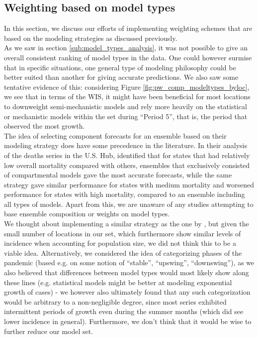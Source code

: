 \subsection{Weighting based on model types} \label{sub:weighting_based_on_model_types}
In this section, we discuss our efforts of implementing weighting schemes that are based on the modeling strategies as discussed previously.\\
As we saw in section \ref{sub:model_types_analysis}, it was not possible to give an overall consistent ranking of model types in the data. One could however surmise that in specific situations, one general type of modeling philosophy could be better suited than another for giving accurate predictions. We also saw some tentative evidence of this: considering Figure \ref{fig:pw_comp_modeltypes_byloc}, we see that in terms of the WIS, it might have been beneficial for most locations to downweight semi-mechanistic models and rely more heavily on the statistical or mechanistic models within the set during ``Period 5'', that is, the period that observed the most growth.\\
The idea of selecting component forecasts for an ensemble based on their modeling strategy does have some precedence in the literature. In their analysis of the deaths series in the U.S. Hub, \cite{taylor_combining_2021} identified that for states that had relatively low overall mortality compared with others, ensembles that exclusively consisted of compartmental models gave the most accurate forecasts, while the same strategy gave similar performance for states with medium mortality and worsened performance for states with high mortality, compared to an ensemble including all types of models. Apart from this, we are unaware of any studies attempting to base ensemble composition or weights on model types.\\
We thought about implementing a similar strategy as the one by \cite{taylor_combining_2021}, but given the small number of locations in our set, which furthermore show similar levels of incidence when accounting for population size, we did not think this to be a viable idea. Alternatively, we considered the idea of categorizing phases of the pandemic (based e.g. on some notion of ``stable'', ``upswing'', ``downswing''), as we also believed that differences between model types would most likely show along these lines (e.g. statistical models might be better at modeling exponential growth of cases) - we however also ultimately found that any such categorization would be arbitrary to a non-negligible degree, since most series exhibited intermittent periods of growth even during the summer months (which did see lower incidence in general). Furthermore, we don't think that it would be wise to further reduce our model set.\\
